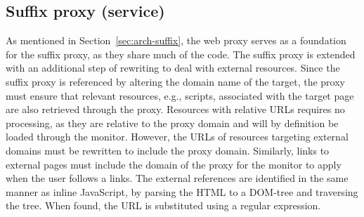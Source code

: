 \documentclass{llncs}
\begin{document}
\vspace{-.4cm}
\subsection{Suffix proxy (service)}
\vspace{-.2cm}



%

As mentioned in Section~\ref{sec:arch-suffix}, the web proxy serves as a 
foundation for the suffix proxy, as they share much of the code. The suffix 
proxy is extended with an additional step of rewriting to deal with external resources.
Since the suffix proxy is referenced by altering the domain name of the target, 
the proxy must ensure that relevant resources, e.g., scripts, associated with the target page are also 
retrieved through the proxy. Resources with relative URLs 
requires no processing, as they are relative to the proxy domain and will by 
definition be loaded through the monitor. 
However, the URLs of resources targeting external domains must be rewritten to 
include the proxy domain. Similarly, links to external pages must include the domain of the proxy
for the %
monitor %
to apply 
when the user follows a links.
The external references are identified in the same manner as inline JavaScript, 
by parsing the HTML to a DOM-tree and traversing the tree. When found, the 
URL is substituted using a regular expression.%
\end{document}
